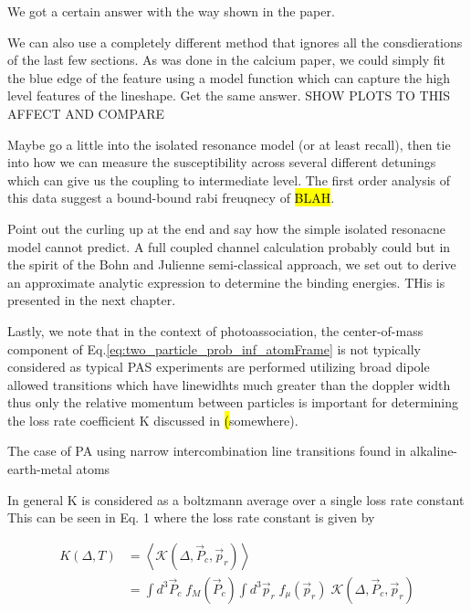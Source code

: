 We got a certain answer with the way shown in the paper.

We can also use a completely different method that ignores all the consdierations of the last few sections. As was done in the calcium paper, we could simply fit the blue edge of the feature using a model function which can capture the high level features of the lineshape. Get the same answer. SHOW PLOTS TO THIS AFFECT AND COMPARE

Maybe go a little into the isolated resonance model (or at least recall), then tie into how we can measure the susceptibility across several different detunings which can give us the coupling to intermediate level. The first order analysis of this data suggest a bound-bound rabi freuqnecy of \hl{BLAH}. 

Point out the curling up at the end and say how the simple isolated resonacne model cannot predict. A full coupled channel calculation probably could but in the spirit of the Bohn and Julienne semi-classical approach, we set out to derive an approximate analytic expression to determine the binding energies. THis is presented in the next chapter.

Lastly, we note that in the context of photoassociation, the center-of-mass component of Eq.\ref{eq:two_particle_prob_inf_atomFrame} is not typically considered as typical PAS experiments are performed utilizing broad dipole allowed transitions which have linewidhts much greater than the doppler width thus only the relative momentum between particles is important for determining the loss rate coefficient K discussed in \hl(somewhere). 



The case of PA using narrow intercombination line transitions found in alkaline-earth-metal atoms 


In general K is considered as a boltzmann average over a single loss rate constant
This can be seen in \cite{Ciuryo2004} Eq. 1 where the loss rate constant is given by

\begin{equation}
\begin{split}
\label{eq:ciuryo04_eq1}
		 K(\Delta,T) &= \left\langle\mathcal{K}(\Delta,\vec{P}_c,\vec{p}_r)\right\rangle \\
		 &= \int d^3\vec{P}_c \; f_M(\vec{P}_c) \int d^3\vec{p}_r \; f_{\mu}(\vec{p}_r) \; \mathcal{K}(\Delta,\vec{P}_c,\vec{p}_r)
\end{split}
\end{equation}



